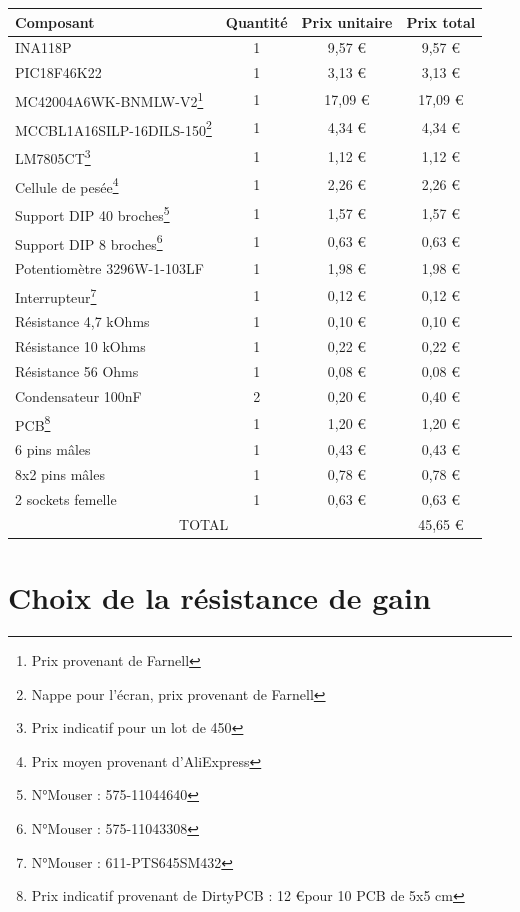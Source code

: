 \documentclass[a4paper,11pt,titlepage]{article}
\begin{document}
\noindent
\begin{tabularx}{\textwidth}{l|c|c|c}
Composant&Quantité&Prix unitaire&Prix total\\
\hline
INA118P & 1 & 9,57 \euro & 9,57 \euro\\
PIC18F46K22 & 1 & 3,13 \euro & 3,13 \euro\\
MC42004A6WK-BNMLW-V2\footnote{Prix provenant de Farnell} & 1 & 17,09 \euro & 17,09 \euro\\
MCCBL1A16SILP-16DILS-150\footnote{Nappe pour l'écran, prix provenant de Farnell} & 1 & 4,34 \euro & 4,34 \euro\\
LM7805CT\footnote{Prix indicatif pour un lot de 450} & 1 & 1,12 \euro & 1,12 \euro\\
Cellule de pesée\footnote{Prix moyen provenant d'AliExpress} & 1 & 2,26 \euro & 2,26 \euro\\
Support DIP 40 broches\footnote{N°Mouser : 575-11044640} & 1 & 1,57 \euro & 1,57 \euro\\
Support DIP 8 broches\footnote{N°Mouser : 575-11043308} & 1 & 0,63 \euro & 0,63 \euro\\
Potentiomètre 3296W-1-103LF&1&1,98 \euro&1,98 \euro\\
Interrupteur\footnote{N°Mouser : 611-PTS645SM432} & 1 & 0,12 \euro & 0,12 \euro\\
Résistance 4,7 kOhms&1&0,10 \euro&0,10 \euro\\
Résistance 10 kOhms&1&0,22 \euro&0,22 \euro\\
Résistance 56 Ohms&1&0,08 \euro&0,08 \euro\\
Condensateur 100nF&2&0,20 \euro&0,40 \euro\\
PCB\footnote{Prix indicatif provenant de DirtyPCB : 12 \euro pour 10 PCB de 5x5 cm} & 1 & 1,20 \euro & 1,20 \euro\\
6 pins mâles&1&0,43 \euro&0,43 \euro\\
8x2 pins mâles&1&0,78 \euro&0,78 \euro\\
2 sockets femelle&1&0,63 \euro&0,63 \euro\\
\hline
\multicolumn{3}{c|}{TOTAL} & 45,65 \euro\\
\end{tabularx}

\section{Choix de la résistance de gain}
\end{document}
